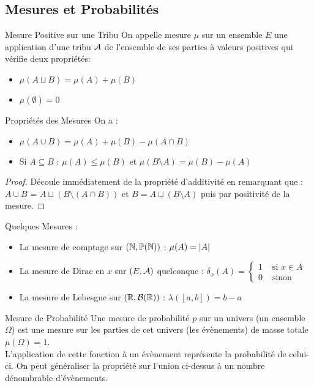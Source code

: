 \documentclass{cours}
\begin{document}
\subsection{Mesures et Probabilités}
\begin{définition}{Mesure Positive sur une Tribu}{}
On appelle mesure $\mu$ sur un ensemble $E$ une application d'une tribu $\mathcal{A}$ de l'ensemble de ses parties à valeurs positives qui vérifie deux propriétés:
\begin{itemize}
    \item $\mu(A \sqcup B) = \mu(A) + \mu(B)$
    \item $\mu(\emptyset) = 0$
\end{itemize}
\end{définition}

\begin{propositionfr}{Propriétés des Mesures}{}
    On a\! :
    \begin{itemize}
        \item $\mu(A \cup B) = \mu(A) + \mu(B) - \mu(A \cap B)$
        \item Si $A \subseteq B$\! : $\mu(A) \leq \mu(B)$ et $\mu(B \setminus A) = \mu(B) - \mu(A)$
    \end{itemize}
\end{propositionfr}

\begin{proof}
    Découle immédiatement de la propriété d'additivité en remarquant que\! : $A \cup B$ = $A \sqcup \left(B \setminus \left(A \cap B\right)\right)$ et $B = A \sqcup \left(B \setminus A\right)$ puis par positivité de la mesure.
\end{proof}

Quelques Mesures\! :
\begin{itemize}
    \item La mesure de comptage sur $\left(\mathbb{N}, \mathbb{P}(\mathbb{N})\right)$\! : $\mu(A) = \left|A\right|$
    \item La mesure de Dirac en $x$ sur $\left(E, \mathcal{A}\right)$ quelconque\! : $\delta_{x}(A) = \begin{cases} 1 &\text{ si } x\in A\\ 0  &\text{ sinon} \end{cases}$
    \item La mesure de Lebesgue sur $\left(\mathbb{R}, \mathcal{B}(\mathbb{R})\right)$\! : $\lambda\left(\left[a, b\right]\right) = b - a$
\end{itemize}

\begin{définition}{Mesure de Probabilité}
Une mesure de probabilité $p$ sur un univers (un ensemble $\Omega$) est une mesure sur les parties de cet univers (les évènements) de masse totale $\mu(\Omega) = 1$.\\
L'application de cette fonction à un évènement représente la probabilité de celui-ci. On peut généraliser la propriété sur l'union ci-dessus à un nombre dénombrable d'évènements.
\end{définition}
\end{document}
